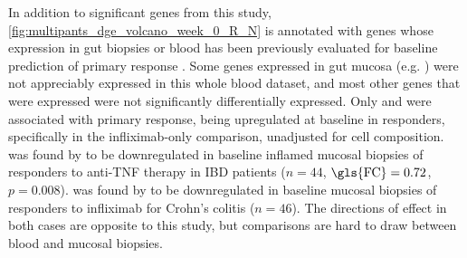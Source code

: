 In addition to significant genes from this study, \cref{fig:multipants_dge_volcano_week_0_R_N} is annotated with genes whose expression in gut biopsies or blood has been previously evaluated for baseline prediction of primary response \autocite{arijs2009MucosalGeneSignatures,arijs2010PredictiveValueEpithelial,verstockt2019LowTREM1Expression,salvador-martin2020GeneSignaturesEarly}.
Some genes expressed in gut mucosa (e.g. ) were not appreciably expressed in this whole blood dataset, 
and most other genes that were expressed were not significantly differentially expressed.
Only  and  were associated with primary response, being upregulated at baseline in responders, specifically in the infliximab-only comparison, unadjusted for cell composition.
 was found by \textcite{verstockt2019LowTREM1Expression} to be downregulated in baseline inflamed mucosal biopsies of responders to anti-\gls{TNF} therapy in \gls{IBD} patients ($n=44$, $\text{\gls{FC}}=0.72$, $p=0.008$).
 was found by \textcite{arijs2009MucosalGeneSignatures} to be downregulated in baseline mucosal biopsies of responders to infliximab for Crohn's colitis ($n=46$).
The directions of effect in both cases are opposite to this study, but comparisons are hard to draw between blood and mucosal biopsies.

